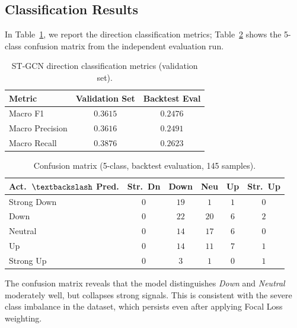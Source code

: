 \documentclass{article}
\begin{document}
\subsection{Classification Results}

In Table~\ref{tab:clf}, we report the direction classification metrics; Table~\ref{tab:cm} shows the 5-class confusion matrix from the independent evaluation run.

\begin{table}[h]
  \centering
  \caption{ST-GCN direction classification metrics (validation set).}
  \vspace{3pt}
  \label{tab:clf}
  \begin{tabular}{lcc}
    \toprule
    Metric & Validation Set & Backtest Eval \\
    \midrule
    Macro F1        & $0.3615$ & $0.2476$ \\
    Macro Precision & $0.3616$ & $0.2491$ \\
    Macro Recall    & $0.3876$ & $0.2623$ \\
    \bottomrule
  \end{tabular}
\end{table}

\begin{table}[h]
  \centering
  \caption{Confusion matrix (5-class, backtest evaluation, 145 samples).}
  \vspace{3pt}
  \label{tab:cm}
  \setlength{\tabcolsep}{4pt}
  \begin{tabular}{lccccc}
    \toprule
    \textbf{Act.\ $\textbackslash$ Pred.} & Str.\ Dn & Down & Neu & Up & Str.\ Up \\
    \midrule
    Strong Down & $0$ & $19$ & $1$  & $1$ & $0$ \\
    Down        & $0$ & $22$ & $20$ & $6$ & $2$ \\
    Neutral     & $0$ & $14$ & $17$ & $6$ & $0$ \\
    Up          & $0$ & $14$ & $11$ & $7$ & $1$ \\
    Strong Up   & $0$ &  $3$ &  $1$ & $0$ & $1$ \\
    \bottomrule
  \end{tabular}
\end{table}

The confusion matrix reveals that the model distinguishes \textit{Down} and \textit{Neutral} moderately well, but collapses strong signals. This is consistent with the severe class imbalance in the dataset, which persists even after applying Focal Loss weighting.
\end{document}
